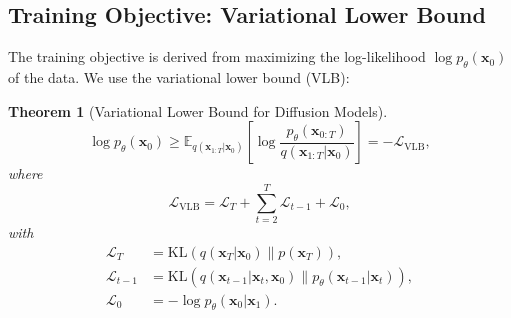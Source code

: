 \documentclass[12pt]{report}
\newtheorem{theorem}{Theorem}[section]
\theoremstyle{definition}
\newcommand{\E}{\mathbb{E}}
\newcommand{\KL}{\text{KL}}
\newcommand{\loss}{\mathcal{L}}
\begin{document}
\subsection{Training Objective: Variational Lower Bound}

The training objective is derived from maximizing the log-likelihood $\log p_\theta(\mathbf{x}_0)$ of the data. We use the variational lower bound (VLB):

\begin{theorem}[Variational Lower Bound for Diffusion Models]
\begin{equation}
\log p_\theta(\mathbf{x}_0) \geq \E_{q(\mathbf{x}_{1:T}|\mathbf{x}_0)}\left[\log \frac{p_\theta(\mathbf{x}_{0:T})}{q(\mathbf{x}_{1:T}|\mathbf{x}_0)}\right] = -\loss_{\text{VLB}},
\label{eq:vlb}
\end{equation}
where
\begin{equation}
\loss_{\text{VLB}} = \loss_T + \sum_{t=2}^T \loss_{t-1} + \loss_0,
\label{eq:vlb_decomposed}
\end{equation}
with
\begin{align}
\loss_T &= \KL(q(\mathbf{x}_T|\mathbf{x}_0) \| p(\mathbf{x}_T)), \label{eq:loss_T} \\
\loss_{t-1} &= \KL(q(\mathbf{x}_{t-1}|\mathbf{x}_t, \mathbf{x}_0) \| p_\theta(\mathbf{x}_{t-1}|\mathbf{x}_t)), \label{eq:loss_t} \\
\loss_0 &= -\log p_\theta(\mathbf{x}_0|\mathbf{x}_1). \label{eq:loss_0}
\end{align}
\end{theorem}
\end{document}
